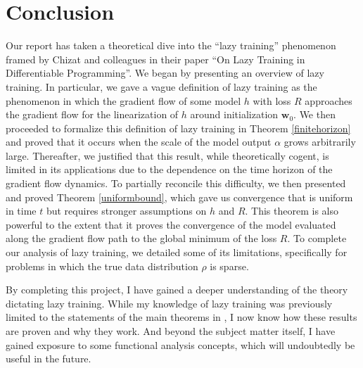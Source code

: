 \documentclass{article}
\begin{document}
\section{Conclusion}
Our report has taken a theoretical dive into the \enquote{lazy training} phenomenon framed by Chizat and colleagues in their paper \enquote{On Lazy Training in Differentiable Programming}. We began by presenting an overview of lazy training. In particular, we gave a vague definition of lazy training as the phenomenon in which the gradient flow of some model $h$ with loss $R$ approaches the gradient flow for the linearization of $h$ around initialization $\boldsymbol{w}_0$. We then proceeded to formalize this definition of lazy training in Theorem \ref{finitehorizon} and proved that it occurs when the scale of the model output $\alpha$ grows arbitrarily large. Thereafter, we justified that this result, while theoretically cogent, is limited in its applications due to the dependence on the time horizon of the gradient flow dynamics. To partially reconcile this difficulty, we then presented and proved Theorem \ref{uniformbound}, which gave us convergence that is uniform in time $t$ but requires stronger assumptions on $h$ and $R$. This theorem is also powerful to the extent that it proves the convergence of the model evaluated along the gradient flow path to the global minimum of the loss $R$. To complete our analysis of lazy training, we detailed some of its limitations, specifically for problems in which the true data distribution $\rho$ is sparse.

By completing this project, I have gained a deeper understanding of the theory dictating lazy training. While my knowledge of lazy training was previously limited to the statements of the main theorems in \cite{chizat2018lazy}, I now know how these results are proven and why they work. And beyond the subject matter itself, I have gained exposure to some functional analysis concepts, which will undoubtedly be useful in the future.

\pagebreak


\end{document}
